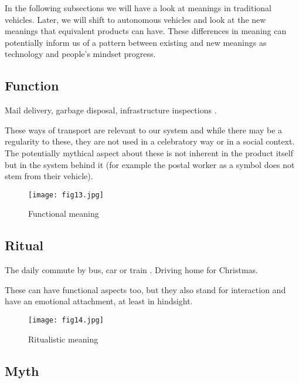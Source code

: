\documentclass[12pt, usenames, dvipsnames]{report}
\begin{document}
\begin{flushleft}
In the following subsections we will have a look at meanings in traditional vehicles. Later, we will shift to autonomous vehicles and look at the new meanings that equivalent products can have. These differences in meaning can potentially inform us of a pattern between existing and new meanings as technology and people's mindset progress.

\subsection{Function}

Mail delivery, garbage disposal, infrastructure inspections \cite{giacomin2020}.

These ways of transport are relevant to our system and while there may be a regularity to these, they are not used in a celebratory way or in a social context. 
The potentially mythical aspect about these is not inherent in the product itself but in the system behind it (for example the postal worker as a symbol does not stem from their vehicle).

\vspace*{1.2em}
\begin{figure}[!htbp]
  \hspace*{5em}
  \texttt{[image: fig13.jpg]}
  \caption{Functional meaning}
  \label{fig:figure13}
\end{figure}
\vspace*{1.2em}

\subsection{Ritual}

The daily commute by bus, car or train \cite{giacomin2020}.
Driving home for Christmas.

These can have functional aspects too, but they also stand for interaction and have an emotional attachment, at least in hindsight.

\vspace*{1.2em}
\begin{figure}[!htbp]
  \hspace*{5em}
  \texttt{[image: fig14.jpg]}
  \caption{Ritualistic meaning}
  \label{fig:figure14}
\end{figure}
\vspace*{1.2em}

\subsection{Myth}


\end{flushleft}
\end{document}

